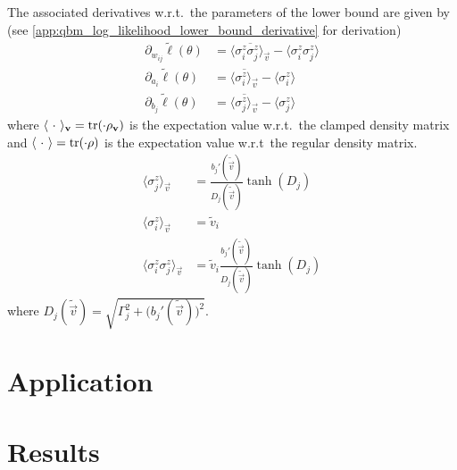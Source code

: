 The associated derivatives w.r.t.\ the parameters of the lower bound are given by (see \cref{app:qbm_log_likelihood_lower_bound_derivative} for derivation)
\begin{align}
    \partial_{w_{ij}} \tilde{\ell}(\theta)
        &= \overline{\langle \sigma_i^z \sigma_j^z \rangle_\vec{v}} - \langle \sigma_i^z \sigma_j^z \rangle \\
    \partial_{a_i} \tilde{\ell}(\theta)
        &= \overline{\langle \sigma_i^z \rangle_\vec{v}} - \langle \sigma_i^z \rangle \\
    \partial_{b_j} \tilde{\ell}(\theta)
        &= \overline{\langle \sigma_j^z \rangle_\vec{v}} - \langle \sigma_j^z \rangle
\end{align}
where \( \langle \ \cdot \ \rangle_{\mathbf{v}} = \text{tr}(\cdot \rho_{\mathbf{v}}) \) is the expectation value w.r.t.\ the clamped density matrix and \( \langle \ \cdot \ \rangle = \text{tr}(\cdot \rho) \) is the expectation value w.r.t\ the regular density matrix.
\begin{align}
    \langle \sigma_j^z \rangle_\vec{v}
        &= \frac{b_j'(\tilde{\vec{v}})}{D_j(\tilde{\vec{v}})} \tanh(D_j) \\
    \langle \sigma_i^z \rangle_\vec{v}
        &= \tilde{v}_i \\
    \langle \sigma_i^z \sigma_j^z \rangle_{\vec{v}}
        &= \tilde{v}_i \frac{b_j'(\tilde{\vec{v}})}{D_j(\tilde{\vec{v}})} \tanh(D_j)
\end{align}
where \( D_j(\tilde{\vec{v}}) = \sqrt{\Gamma_j^2 + \big(b_j'(\tilde{\vec{v}})\big)^2} \).




\section{Application}

\section{Results}
